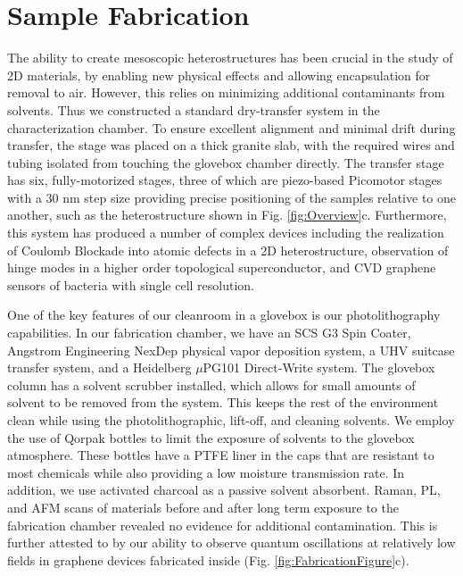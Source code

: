 \section{\label{sec:level3}Sample Fabrication}
The ability to create mesoscopic heterostructures has been crucial in the study of 2D materials, by enabling new physical effects and allowing encapsulation for removal to air.\cite{Dean:2012ht,Sharpe2019,Wu2018WTe2,stepanov2018long,Tang2017WTe2,Zareapour:2012ja,Island2019,Chae2016} However, this relies on minimizing additional contaminants from solvents. Thus we constructed a standard dry-transfer system in the characterization chamber. To ensure excellent alignment and minimal drift during transfer, the stage was placed on a thick granite slab, with the required wires and tubing isolated from touching the glovebox chamber directly. The transfer stage has six, fully-motorized stages, three of which are piezo-based Picomotor stages with a 30 nm step size providing precise positioning of the samples relative to one another, such as the heterostructure shown in Fig. \ref{fig:Overview}c. Furthermore, this system has produced a number of complex devices including the realization of Coulomb Blockade into atomic defects in a 2D heterostructure\cite{Brotons-Gisbert2019}, observation of hinge modes in a higher order topological superconductor,\cite{Gray2019} and CVD graphene sensors of bacteria with single cell resolution\cite{KUMAR2020112123}. 

One of the key features of our cleanroom in a glovebox is our photolithography capabilities. In our fabrication chamber, we have an SCS G3 Spin Coater, Angstrom Engineering NexDep physical vapor deposition system, a UHV suitcase transfer system, and a Heidelberg $\mu$PG101 Direct-Write system. The glovebox column has a solvent scrubber installed, which allows for small amounts of solvent to be removed from the system. This keeps the rest of the environment clean while using the photolithographic, lift-off, and cleaning solvents. We employ the use of Qorpak bottles to limit the exposure of solvents to the glovebox atmosphere. These bottles have a PTFE liner in the caps that are resistant to most chemicals while also providing a low moisture transmission rate. In addition, we use activated charcoal as a passive solvent absorbent. Raman, PL, and AFM scans of materials before and after long term exposure to the fabrication chamber revealed no evidence for additional contamination. This is further attested to by our ability to observe quantum oscillations at relatively low fields in graphene devices fabricated inside (Fig. \ref{fig:FabricationFigure}c). 

